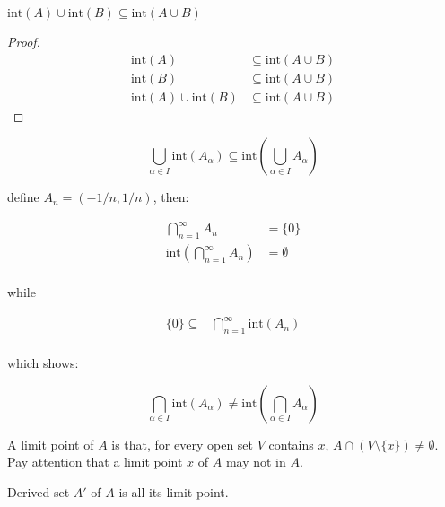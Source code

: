 \begin{lem}
$\mathrm{int}(A) \cup \mathrm{int}(B)  \subseteq \mathrm{int}(A \cup B)$
\end{lem}

\begin{proof}
\begin{align*}
    \mathrm{int}(A) &\subseteq \mathrm{int}(A \cup B) \\
    \mathrm{int}(B) &\subseteq \mathrm{int}(A \cup B) \\
\mathrm{int}(A) \cup \mathrm{int}(B) & \subseteq \mathrm{int}(A \cup B)
\end{align*}
\end{proof}

\begin{corollary}
    \label{col:bigcup-int-subseteq-int-bigcup}
    \[
        \bigcup_{\alpha \in I}\mathrm{int}(A_{\alpha}) \subseteq  \mathrm{int}(\bigcup_{\alpha \in I}A_{\alpha})
    \]
\end{corollary}

\begin{remark}
    define $A_n = (-1/n, 1/n)$, then:
    
    \begin{align*}
        \bigcap_{n=1}^{\infty} A_n &= \{ 0 \} \\
        \mathrm{int}(\bigcap_{n=1}^{\infty} A_n) &= \emptyset \\
    \end{align*}

    while

    \begin{align*}
        \{ 0\} \subseteq & \bigcap_{n=1}^{\infty} \mathrm{int}(A_n) \\
    \end{align*}

    which shows:

    \[
        \bigcap_{\alpha \in I}\mathrm{int}(A_{\alpha}) \ne  \mathrm{int}(\bigcap_{\alpha \in I}A_{\alpha})
    \]
\end{remark}

\begin{definition}
   A limit point of $A$ is that, for every open set $V$ contains $x$, $A \cap \left( V \setminus \{x\} \right) \ne \emptyset$.
   Pay attention that a limit point $x$ of $A$ may not in $A$. 
\end{definition}

\begin{definition}
    Derived set $A'$ of $A$ is all its limit point.
\end{definition}

